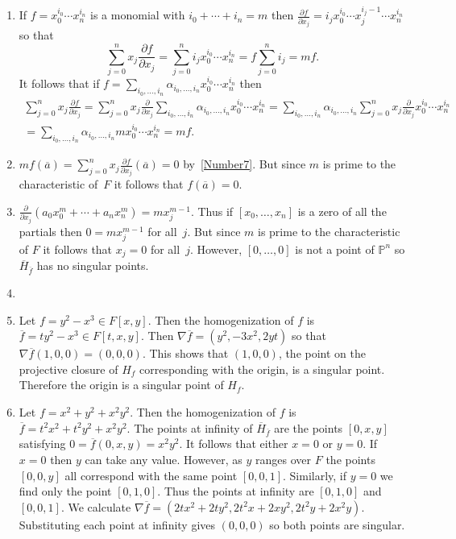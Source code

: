 \documentclass[12pt]{article}
\begin{document}
\begin{enumerate}
\item\label{Number7} %
If $f=x_0^{i_0}\cdots x_n^{i_n}$ is a monomial with $i_0+\cdots+i_n=m$ then 
$\frac{\partial f}{\partial x_j}=i_jx_0^{i_0}\cdots x_j^{i_j-1}
\cdots x_n^{i_n}$ so that
\[\sum_{j=0}^n
x_j\frac{\partial f}{\partial x_j}
=\sum_{j=0}^ni_jx_0^{i_0}\cdots x_n^{i_n}
=f\sum_{j=0}^ni_j=mf.\]
It follows that if $f=\sum_{i_0,\ldots,i_n}
\alpha_{i_0,\ldots,i_n}x_0^{i_0}\cdots x_n^{i_n}$ then
\begin{multline*}
\sum_{j=0}^n
x_j\frac{\partial f}{\partial x_j}
=\sum_{j=0}^n x_j\frac{\partial}{\partial x_j}
\sum_{i_0,\ldots,i_n}
\alpha_{i_0,\ldots,i_n}x_0^{i_0}\cdots x_n^{i_n}
=\sum_{i_0,\ldots,i_n}\alpha_{i_0,\ldots,i_n}
\sum_{j=0}^n x_j\frac{\partial}{\partial x_j}
x_0^{i_0}\cdots x_n^{i_n}\\
=\sum_{i_0,\ldots,i_n}
\alpha_{i_0,\ldots,i_n}
mx_0^{i_0}\cdots x_n^{i_n}=mf.
\end{multline*}

\item %
$mf\left(\overline{a}\right)=
\sum_{j=0}^n x_j\frac{\partial f}{\partial x_j}\left(\overline{a}\right)
=0$ by~\autoref{Number7}.
But since $m$ is prime to the characteristic
of~$F$ it follows that $f\left(\overline{a}\right)=0$.

\item %
$\frac{\partial}{\partial x_j}
\left(a_0x_0^m+\cdots+a_nx_n^m\right)=
mx_j^{m-1}$. Thus if $\left[x_0,\ldots,x_n\right]$
is a zero of all the partials
then $0=mx_j^{m-1}$ for all~$j$. But since $m$ is prime
to the characteristic of $F$ it follows that $x_j=0$ for all~$j$.
However, $\left[0,\ldots,0\right]$ is not a point of
$\mathbb{P}^n$ so $\overline{H}_{\overline{f}}$ has no singular points.

\item %
\item %
Let $f=y^2-x^3\in F\left[x,y\right]$.
Then the homogenization of $f$
is $\overline{f}=ty^2-x^3\in F\left[t,x,y\right]$.
Then $\nabla\overline{f}=\left(y^2,-3x^2,2yt\right)$ so that
$\nabla\overline{f}\left(1,0,0\right)
=\left(0,0,0\right)$. This shows that $\left(1,0,0\right)$,
the point on the projective closure
of $H_f$ corresponding with the origin, is a singular point.
Therefore the origin is a singular point of $H_f$.

\item %
Let $f=x^2+y^2+x^2y^2$. Then the homogenization of $f$
is $\overline{f}=t^2x^2+t^2y^2+x^2y^2$. The points at infinity
of $\overline{H}_{\overline{f}}$ are the points $\left[0,x,y\right]$
satisfying $0=\overline{f}\left(0,x,y\right)=x^2y^2$.
It follows that either $x=0$ or $y=0$. If $x=0$ then $y$
can take any value. However, as $y$ ranges over $F$ the points
$\left[0,0,y\right]$ all correspond with the same point
$\left[0,0,1\right]$. Similarly, if $y=0$ we find only
the point $\left[0,1,0\right]$. Thus the points at infinity are
$\left[0,1,0\right]$ and $\left[0,0,1\right]$.
We calculate $\nabla\overline{f}
=\left(2tx^2+2ty^2,2t^2x+2xy^2,2t^2y+2x^2y\right)$.
Substituting each point at infinity gives $\left(0,0,0\right)$
so both points are singular.
\end{enumerate}
\end{document}
